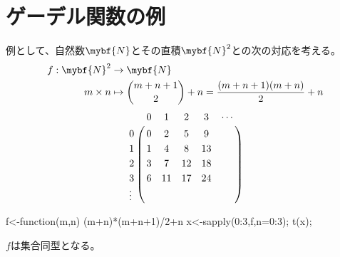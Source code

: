 \section{ゲーデル関数の例}\label{s1:ゲーデル関数の例} %
	例として、自然数$\mybf{N}$とその直積$\mybf{N}^2$との次の対応を考える。
	\begin{equation*}\begin{split} %
		f:\mybf{N}^2 &\to \mybf{N} \\
			m\times n &\mapsto \binom{m+n+1}{2}+n = \frac{(m+n+1)(m+n)}{2}+n \\
	\end{split}\end{equation*} %
	\begin{equation*}\begin{split} %
		\bordermatrix {
			  & 0 & 1 & 2 & 3 & \cdots \\
			0 & 0 & 2 & 5 & 9 & \\
			1 & 1 & 4 & 8 & 13 & \\
			2 & 3 & 7 & 12 & 18 & \\
			3 & 6 & 11 & 17 & 24 & \\
			\vdots & & & & & \\
		}
	\end{split}\end{equation*} %
	\begin{cprog}
		f<-function(m,n) (m+n)*(m+n+1)/2+n
		x<-sapply(0:3,f,n=0:3);
		t(x);
	\end{cprog}
	$f$は集合同型となる。

